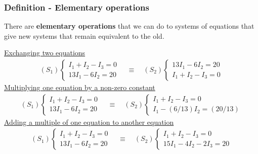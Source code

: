\documentclass[usenames,dvipsnames,aspectratio=169,10pt]{beamer}
\numberwithin{equation}{section}
\begin{document}
\begin{frame}
\frametitle{Definition - Elementary operations}

There are \textbf{elementary operations} that we can do to systems of equations that give new systems that remain equivalent to the old.

\centering

\underline{Exchanging two equations} \vspace{-0.4cm}
\begin{align*}
(S_1)
\begin{cases}
    I_1 +   I_2 -   I_3 =  0 \\
 13 I_1 - 6 I_2         = 20 
\end{cases}
\quad\equiv\quad
(S_2)
\begin{cases}
 13 I_1 - 6 I_2         = 20 \\
    I_1 +   I_2 -   I_3 =  0 
\end{cases}
\end{align*}
\underline{Multiplying one equation by a non-zero constant} \vspace{-0.4cm}
\begin{align*}
(S_1)
\begin{cases}
    I_1 +   I_2 -   I_3 =  0 \\
 13 I_1 - 6 I_2         = 20 
\end{cases}
\quad\equiv\quad
(S_2)
\begin{cases}
    I_1 +   I_2 -   I_3 =  0 \\
 I_1 - (6/13) I_2         = (20/13) 
\end{cases}
\end{align*}
\underline{Adding a multiple of one equation to another equation} \vspace{-0.4cm}
\begin{align*}
(S_1)
\begin{cases}
    I_1 +   I_2 -   I_3 =  0 \\
 13 I_1 - 6 I_2         = 20 
\end{cases}
\quad\equiv\quad
(S_2)
\begin{cases}
    I_1 +   I_2 -   I_3 =  0 \\
 15 I_1 - 4 I_2 - 2 I_3 = 20 
\end{cases}
\end{align*}

\end{frame}
\end{document}
